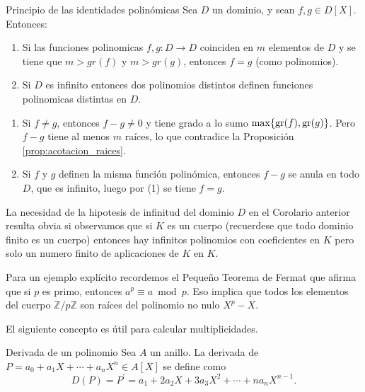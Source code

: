\begin{corollary}{Principio de las identidades polinómicas}{}
Sea $D$ un dominio, y sean $f, g \in D[X]$. Entonces:

\begin{enumerate}
\item Si las funciones polinomicas $f,g:D\to D$ coinciden en $m$ elementos de $D$ y se tiene que $m>gr(f)$ y $m>gr(g)$, entonces $f=g$ (como polinomios).

\item Si $D$ es infinito entonces dos polinomios distintos definen funciones polinomicas distintas en $D$.
\end{enumerate}
\end{corollary}

\begin{proofbox}

\begin{enumerate}
\item Si $f \neq g$, entonces $f - g \neq 0$ y tiene grado a lo sumo $\max\{\operatorname{gr}(f), \operatorname{gr}(g)\}$. Pero $f-g$ tiene al menos $m$ raíces, lo que contradice la Proposición \ref{prop:acotacion_raices}.

\item Si $f$ y $g$ definen la misma función polinómica, entonces $f-g$ se anula en todo $D$, que es infinito, luego por (1) se tiene $f=g$.
\end{enumerate}

\end{proofbox}

La necesidad de la hipotesis de infinitud del dominio $D$ en el Corolario anterior resulta obvia si observamos que si $K$ es un cuerpo (recuerdese que todo dominio finito es un cuerpo) entonces hay infinitos polinomios con coeficientes en $K$ pero solo un numero finito de aplicaciones de $K$ en $K$.

Para un ejemplo explícito recordemos el Pequeño Teorema de Fermat que afirma que si $p$ es primo, entonces $a^{p}\equiv a \bmod p$. Eso implica que todos los elementos del cuerpo $\mathbb{Z}/p\mathbb{Z}$ son raíces del polinomio no nulo $X^{p}-X$.

El siguiente concepto es útil para calcular multiplicidades.

\begin{definition}{Derivada de un polinomio}{}
Sea $A$ un anillo. La derivada de $P=a_{0}+a_{1}X+\cdots+a_{n}X^{n}\in A[X]$ se define como
\[
D(P)=P^{\prime}=a_{1}+2a_{2}X+3a_{3}X^{2}+\cdots+na_{n}X^{n-1}.
\]
\end{definition}

